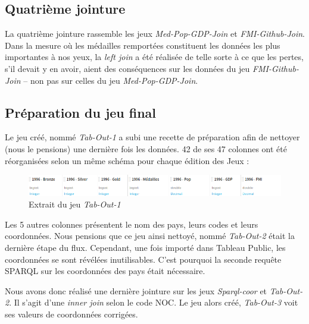 \documentclass[hidelinks, 12pt]{report}
\begin{document}
%





\subsection{Quatrième jointure}

La quatrième jointure rassemble les jeux \textit{Med-Pop-GDP-Join} et \textit{FMI-Github-Join}. Dans la mesure où les médailles remportées constituent les données les plus importantes à nos yeux, la \textit{left join} a été réalisée de telle sorte à ce que les pertes, s'il devait y en avoir, aient des conséquences sur les données du jeu \textit{FMI-Github-Join} -- non pas sur celles du jeu \textit{Med-Pop-GDP-Join}.





%





\subsection{Préparation du jeu final}

Le jeu créé, nommé \textit{Tab-Out-1} a subi une recette de préparation afin de nettoyer (nous le pensions) une dernière fois les données. \label{orga}42 de ses 47 colonnes ont été réorganisées selon un même schéma pour chaque édition des Jeux :

\begin{center}
	\begin{figure}[H]
		\setlength{\belowcaptionskip}{-35pt}
		\includegraphics[scale=0.5]{images/tab-out.png}
		\caption{Extrait du jeu \textit{Tab-Out-1}}
	\end{figure}
\end{center}

Les 5 autres colonnes présentent le nom des pays, leurs codes et leurs coordonnées. Nous pensions que ce jeu ainsi nettoyé, nommé \textit{Tab-Out-2} était la dernière étape du flux. Cependant, une fois importé dans Tableau Public, les coordonnées se sont révélées inutilisables. C'est pourquoi la seconde requête SPARQL sur les coordonnées des pays était nécessaire. 

Nous avons donc réalisé une dernière jointure sur les jeux \textit{Sparql-coor} et \textit{Tab-Out-2}. Il s'agit d'une \textit{inner join} selon le code NOC. Le jeu alors créé, \textit{Tab-Out-3} voit ses valeurs de coordonnées corrigées.
\end{document}
